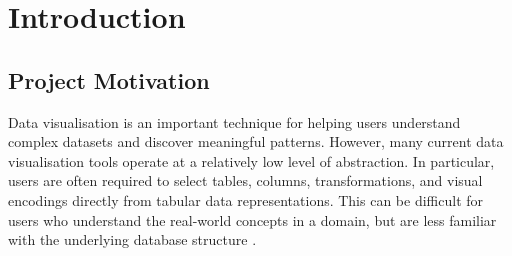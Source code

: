 \providecommand{\phfig}[3]{%
  \begin{figure}[htbp]
  \centering
  \begin{tikzpicture}
    \node[draw, fill=gray!12, rounded corners, align=center,
          minimum width=#1\textwidth, minimum height=0.38\textwidth,
          text width=#1\textwidth, inner sep=10pt]
      {\emph{[Placeholder figure]}\\[4pt]\footnotesize #2};
  \end{tikzpicture}
  \caption{#2}
  \label{#3}
  \end{figure}%
}

\def\cmark{\textbf{P}}
\def\xmark{\textbf{F}}

\ifdefined\lstdefinestyle
\fi

\chapter{Introduction}

\section{Project Motivation}

Data visualisation is an important technique for helping users understand complex datasets and discover meaningful patterns. However, many current data visualisation tools operate at a relatively low level of abstraction. In particular, users are often required to select tables, columns, transformations, and visual encodings directly from tabular data representations. This can be difficult for users who understand the real-world concepts in a domain, but are less familiar with the underlying database structure \cite{brientowards}.

